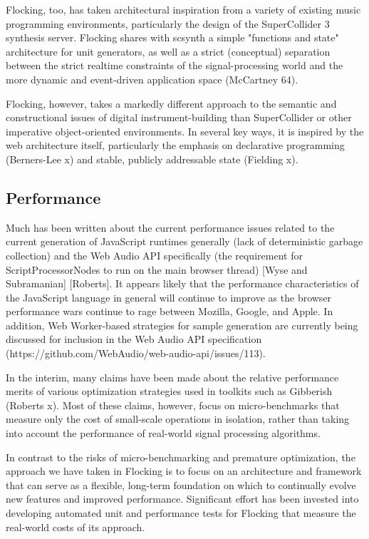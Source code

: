 \documentclass{article}
\begin{document}
Flocking, too, has taken architectural inspiration from a variety of existing music programming environments, particularly the design of the SuperCollider 3 synthesis server. Flocking shares with scsynth a simple "functions and state" architecture for unit generators, as well as a strict (conceptual) separation between the strict realtime constraints of the signal-processing world and the more dynamic and event-driven application space (McCartney 64).

Flocking, however, takes a markedly different approach to the semantic and constructional issues of digital instrument-building than SuperCollider or other imperative object-oriented environments. In several key ways, it is inspired by the web architecture itself, particularly the emphasis on declarative programming (Berners-Lee x) and stable, publicly addressable state (Fielding x).

\subsection{Performance}

Much has been written about the current performance issues related to the current generation of JavaScript runtimes generally (lack of deterministic garbage collection) and the Web Audio API specifically (the requirement for ScriptProcessorNodes to run on the main browser thread) [Wyse and Subramanian] [Roberts]. It appears likely that the performance characteristics of the JavaScript language in general will continue to improve as the browser performance wars continue to rage between Mozilla, Google, and Apple. In addition, Web Worker-based strategies for sample generation are currently being discussed for inclusion in the Web Audio API specification (https://github.com/WebAudio/web-audio-api/issues/113).

In the interim, many claims have been made about the relative performance merits of various optimization strategies used in toolkits such as Gibberish (Roberts x). Most of these claims, however, focus on micro-benchmarks that measure only the cost of small-scale operations in isolation, rather than taking into account the performance of real-world signal processing algorithms.

In contrast to the risks of micro-benchmarking and premature optimization, the approach we have taken in Flocking is to focus on an architecture and framework that can serve as a flexible, long-term foundation on which to continually evolve new features and improved performance. Significant effort has been invested into developing automated unit and performance tests for Flocking that measure the real-world costs of its approach.
\end{document}
